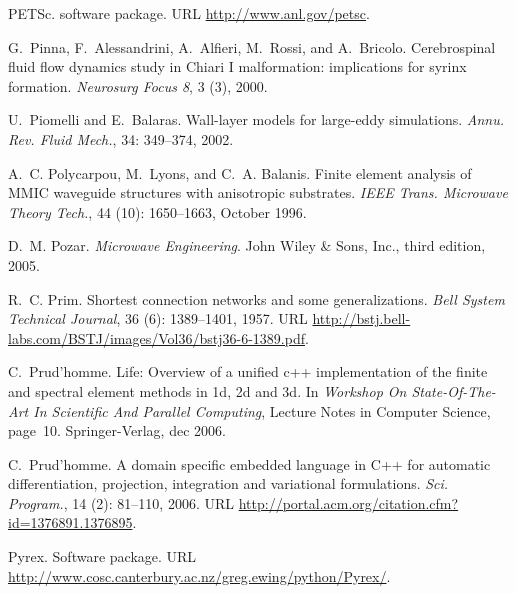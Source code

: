\begin{thebibliography}{467}
PETSc.
\newblock software package.
\newblock URL \url{http://www.anl.gov/petsc}.

G.~Pinna, F.~Alessandrini, A.~Alfieri, M.~Rossi, and A.~Bricolo.
\newblock Cerebrospinal fluid flow dynamics study in {C}hiari {I} malformation:
  implications for syrinx formation.
\newblock \emph{Neurosurg Focus 8}, 3 (3), 2000.

U.~Piomelli and E.~Balaras.
\newblock Wall-layer models for large-eddy simulations.
\newblock \emph{Annu. Rev. Fluid Mech.}, 34: 349--374, 2002.

A.~C. Polycarpou, M.~Lyons, and C.~A. Balanis.
\newblock Finite element analysis of {MMIC} waveguide structures with
  anisotropic substrates.
\newblock \emph{IEEE Trans. Microwave Theory Tech.}, 44 (10):
  1650--1663, October 1996.

D.~M. Pozar.
\newblock \emph{Microwave Engineering}.
\newblock John Wiley \& Sons, Inc., third edition, 2005.

R.~C. Prim.
\newblock Shortest connection networks and some generalizations.
\newblock \emph{Bell System Technical Journal}, 36 (6):
  1389--1401, 1957.
\newblock URL
  \url{http://bstj.bell-labs.com/BSTJ/images/Vol36/bstj36-6-1389.pdf}.

C.~Prud'homme.
\newblock Life: Overview of a unified c++ implementation of the finite and
  spectral element methods in 1d, 2d and 3d.
\newblock In \emph{Workshop On State-Of-The-Art In Scientific And Parallel
  Computing}, Lecture Notes in Computer Science, page~10. Springer-Verlag, dec
  2006{}.

C.~Prud'homme.
\newblock A domain specific embedded language in {C++} for automatic
  differentiation, projection, integration and variational formulations.
\newblock \emph{Sci. Program.}, 14 (2): 81--110,
  2006{}.
\newblock URL \url{http://portal.acm.org/citation.cfm?id=1376891.1376895}.

Pyrex.
\newblock Software package.
\newblock URL \url{http://www.cosc.canterbury.ac.nz/greg.ewing/python/Pyrex/}.


\end{thebibliography}
